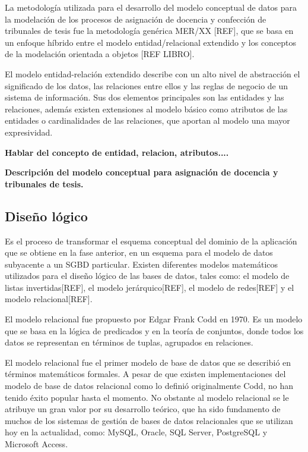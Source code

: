 La metodología utilizada 
para el desarrollo del modelo conceptual de datos para la modelación 
de los procesos de asignación de docencia y confección de tribunales de 
tesis fue la metodología genérica MER/XX [REF], que se basa en un enfoque
híbrido entre el modelo entidad/relacional extendido y los conceptos de la 
modelación orientada a objetos [REF LIBRO]. 

El modelo entidad-relación extendido describe con un alto nivel de abstracción
el significado de los datos, las relaciones entre ellos y las reglas de negocio 
de un sistema de información. Sus dos elementos principales son las entidades y 
las relaciones, además existen extensiones al modelo básico 
como atributos de las entidades o cardinalidades de las relaciones, 
que aportan al modelo una mayor expresividad.


\textbf{Hablar del concepto de entidad, relacion, atributos....}

\textbf{Descripción del modelo conceptual para asignación de docencia y 
tribunales de tesis.}


\subsection{Diseño lógico}
Es el proceso de transformar el esquema conceptual del dominio de la aplicación
que se obtiene en la fase anterior,
en un esquema para el modelo de datos subyacente a un SGBD particular.
Existen diferentes modelos matemáticos utilizados para el diseño lógico
de las bases de datos, tales como: el modelo de listas invertidas[REF], el modelo 
jerárquico[REF], el modelo de redes[REF] y el modelo relacional[REF]. 

El modelo relacional fue propuesto por Edgar Frank Codd en 1970. Es un 
modelo que se basa en la lógica de predicados y en la teoría 
de conjuntos, donde todos los datos se representan en términos de tuplas, 
agrupados en relaciones.

El modelo relacional fue el primer modelo de base de datos que se describió en términos 
matemáticos formales. A pesar de que existen  
implementaciones del modelo de base de datos relacional como lo definió originalmente 
Codd, no han tenido éxito popular hasta el momento. No obstante al modelo relacional se le 
atribuye un gran valor por su desarrollo teórico, que ha sido fundamento de muchos de los 
sistemas de gestión de bases de datos relacionales que se utilizan hoy en la actualidad, como:
MySQL, Oracle, SQL Server, PostgreSQL y Microsoft Access. 

